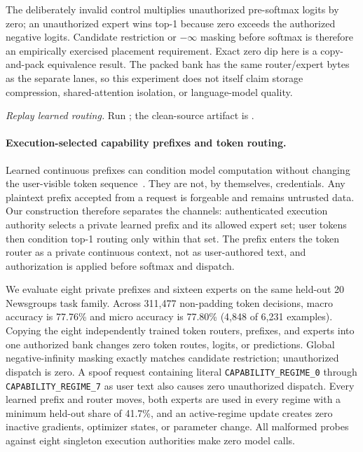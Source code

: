 \documentclass[11pt,a4paper]{article}
\begin{document}
The deliberately invalid control multiplies unauthorized pre-softmax logits by
zero; an unauthorized expert wins top-1 because zero exceeds the authorized
negative logits. Candidate restriction or $-\infty$ masking before softmax is
therefore an empirically exercised placement requirement. Exact zero dip here
is a copy-and-pack equivalence result. The packed bank has the same
router/expert bytes as the separate lanes, so this experiment does not itself
claim storage compression, shared-attention isolation, or language-model
quality.

\begin{sloppypar}
\noindent\textit{Replay learned routing.} Run
; the clean-source artifact is
.
\end{sloppypar}

\paragraph{Execution-selected capability prefixes and token routing.}
Learned continuous prefixes can condition model computation without changing
the user-visible token sequence~\citep{li2021prefix}. They are not, by
themselves, credentials. Any plaintext prefix accepted from a request is
forgeable and remains untrusted data. Our construction therefore separates the
channels: authenticated execution authority selects a private learned prefix and
its allowed expert set; user tokens then condition top-1 routing only within
that set. The prefix enters the token router as a private continuous context,
not as user-authored text, and authorization is applied before softmax and
dispatch.

We evaluate eight private prefixes and sixteen experts on the same held-out
20 Newsgroups task family. Across 311,477 non-padding token decisions, macro
accuracy is 77.76\% and micro accuracy is 77.80\% (4,848 of 6,231 examples).
Copying the eight independently trained token routers, prefixes, and experts
into one authorized bank changes zero token routes, logits, or predictions.
Global negative-infinity masking exactly matches candidate restriction;
unauthorized dispatch is zero. A spoof request containing literal
\texttt{CAPABILITY\_REGIME\_0} through
\texttt{CAPABILITY\_REGIME\_7} as user text also causes zero unauthorized
dispatch. Every learned prefix and router moves, both experts are used in every
regime with a minimum held-out share of 41.7\%, and an active-regime update
creates zero inactive gradients, optimizer states, or parameter change. All
malformed probes against eight singleton execution authorities make zero model
calls.
\end{document}
